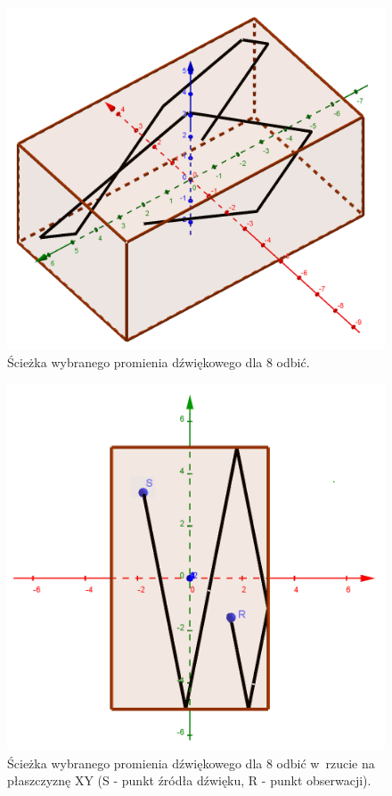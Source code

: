 \begin{figure}[H]
        \centering
                \centering
                \includegraphics[width=12cm]{odbicia}
	\caption{Ścieżka wybranego promienia dźwiękowego dla 8 odbić.}
\end{figure}

\begin{figure}[H]
        \centering
                \centering
                \includegraphics[width=12cm]{odbiciaz}
	\caption{Ścieżka wybranego promienia dźwiękowego dla 8 odbić w~rzucie na płaszczyznę XY (S - punkt źródła dźwięku, R - punkt obserwacji).}
\end{figure}

